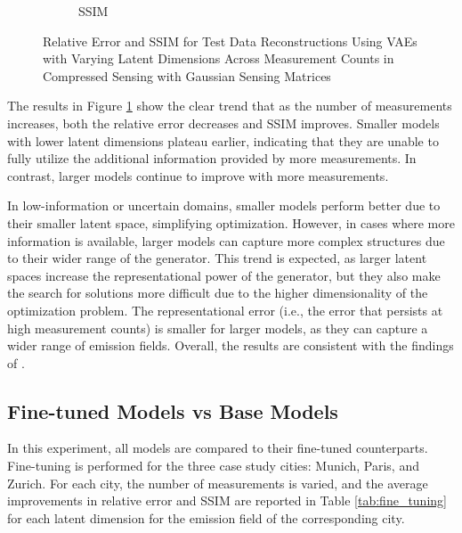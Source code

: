 \begin{figure}[h!]
\begin{subfigure}[b]{0.49\textwidth}
        \caption{SSIM}
    \end{subfigure}
    \caption{Relative Error and SSIM for Test Data Reconstructions Using VAEs with Varying Latent Dimensions Across Measurement Counts in Compressed Sensing with Gaussian Sensing Matrices}
    \label{fig:experiment_latent_dim}
\end{figure}

The results in Figure \ref{fig:experiment_latent_dim} show the clear trend that as the number of measurements increases, both the relative error decreases and \gls{SSIM} improves.
Smaller models with lower latent dimensions plateau earlier, indicating that they are unable to fully utilize the additional information provided by more measurements.
In contrast, larger models continue to improve with more measurements.

In low-information or uncertain domains, smaller models perform better due to their smaller latent space, simplifying optimization.
However, in cases where more information is available, larger models can capture more complex structures due to their wider range of the generator.
This trend is expected, as larger latent spaces increase the representational power of the generator, but they also make the search for solutions more difficult due to the higher dimensionality of the optimization problem.
The representational error (i.e., the error that persists at high measurement counts) is smaller for larger models, as they can capture a wider range of emission fields.
Overall, the results are consistent with the findings of \textcite{CSUsingAI}.

\subsection{Fine-tuned Models vs Base Models}
In this experiment, all models are compared to their fine-tuned counterparts.
Fine-tuning is performed for the three case study cities: Munich, Paris, and Zurich.
For each city, the number of measurements is varied, and the average improvements in relative error and \gls{SSIM} are reported in Table \ref{tab:fine_tuning} for each latent dimension for the emission field of the corresponding city.

